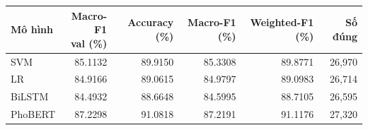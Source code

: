 \begin{tabular}{lrrrrr}\toprule
Mô hình & \shortstack{Macro-F1\\val (\%)} & Accuracy (\%) & Macro-F1 (\%) & Weighted-F1 (\%) & Số đúng\\\midrule
SVM & 85.1132 & 89.9150 & 85.3308 & 89.8771 & 26,970\\
LR & 84.9166 & 89.0615 & 84.9797 & 89.0983 & 26,714\\
BiLSTM & 84.4932 & 88.6648 & 84.5995 & 88.7105 & 26,595\\
PhoBERT & 87.2298 & 91.0818 & 87.2191 & 91.1176 & 27,320\\
\bottomrule\end{tabular}

